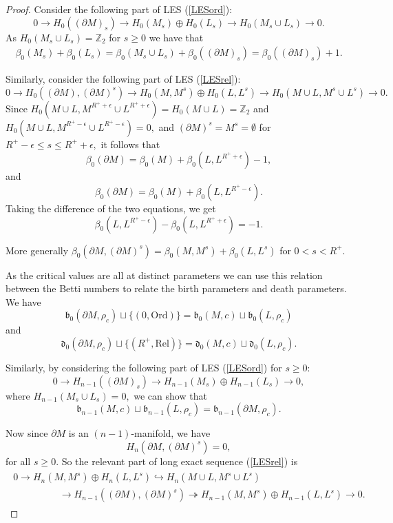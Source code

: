 \documentclass[a4paper,11pt]{article}
\theoremstyle{definition}
\newcommand{\Z}{\mathbb{Z}}
\begin{document}
\begin{proof}

Consider the following part of LES (\ref{LESord}):
$$0\to H_0((\partial M)_s)\to H_0(M_s)\oplus H_0(L_s) \to H_0(M_s\cup L_s)\to 0.$$ As $H_0(M_s\cup L_s) = \Z_2$ for $s\geq 0$ we have that 
\begin{align}\label{rel2}\beta_0(M_s)+\beta_0(L_s) = \beta_0(M_s\cup L_s) +\beta_0((\partial M)_s) = \beta_0((\partial M)_s) + 1.\end{align}

Similarly, consider the following part of LES (\ref{LESrel}):
$$0\to H_0((\partial M),(\partial M)^s)\to H_0(M,M^s)\oplus H_0(L,L^s) \to H_0(M\cup L,M^s\cup L^s)\to 0.$$
Since $H_0(M\cup L,M^{R^+ +\epsilon}\cup L^{R^+ +\epsilon}) = H_0(M\cup L) = \Z_2$ and $H_0(M\cup L,M^{R^+-\epsilon}\cup L^{R^+-\epsilon})  = 0,$ and $(\partial M)^s = M^s=\emptyset$ for $R^+ -\epsilon\leq s\leq R^+ +\epsilon,$ it follows that
$$\beta_0(\partial M)=\beta_0(M)+\beta_0(L,L^{R^+ +\epsilon})-1,$$ and 
$$\beta_0(\partial M)=\beta_0(M)+\beta_0(L,L^{R^+ -\epsilon}).$$ Taking the difference of the two equations, we get
$$\beta_0(L,L^{R^+ -\epsilon})-\beta_0(L,L^{R^+ +\epsilon})=-1.$$ 

More generally $\beta_0(\partial M, (\partial M)^s)=\beta_0(M, M^s)+\beta_0(L,L^{s})$ for $0<s<R^+$. 

As the critical values are all at distinct parameters we can use this relation between the Betti numbers to relate the birth parameters and death parameters.
We have $$\mathfrak{b}_0(\partial M,\rho_c)\sqcup \{(0,\text{Ord})\} = \mathfrak{b}_0(M,c)\sqcup \mathfrak{b}_0(L,\rho_c)$$ 
and 
$$\mathfrak{d}_0(\partial M,\rho_c)\sqcup \{(R^+,\text{Rel})\} = \mathfrak{d}_0(M,c)\sqcup \mathfrak{d}_0(L,\rho_c).$$ 

Similarly, by considering the following part of LES (\ref{LESord}) for $s\ge 0$:
$$0\to H_{n-1}((\partial M)_s)\to H_{n-1}(M_s)\oplus H_{n-1}(L_s) \to 0,$$ where $H_{n-1}(M_s\cup L_s) = 0,$ we can show that 
$$\mathfrak{b}_{n-1}(M,c)\sqcup  \mathfrak{b}_{n-1}(L,\rho_c)= \mathfrak{b}_{n-1}(\partial M,\rho_c).$$

Now since $\partial M$ is an $(n-1)$-manifold, we have 
$$H_n(\partial M,(\partial M)^s) = 0,$$ for all $s\ge 0$. So the relevant part of long exact sequence (\ref{LESrel}) is
\begin{align}\label{LESYAY3}
\begin{split}
   0 \overset{}{\longrightarrow} H_n(M,M^s)\oplus H_n(L,L^s)\hookrightarrow H_n(M\cup L,M^s\cup L^s) \hspace{3cm}\\
  \hspace{2cm} \longrightarrow H_{n-1}((\partial M), (\partial M)^s)
  \twoheadrightarrow H_{n-1}(M,M^s)\oplus H_{n-1}(L,L^s)\overset{}{\longrightarrow} 0.
\end{split}
\end{align} 


\end{proof}
\end{document}
